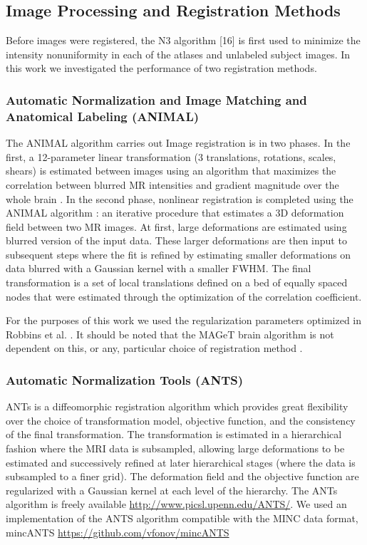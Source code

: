 \documentclass{article}\usepackage{graphicx, color}
\newcommand{\marginnote}[1]{\-\marginpar[\raggedleft\footnotesize #1]{\raggedright\footnotesize #1}}
\newcommand{\todo}[1]{\marginnote{\textcolor{red}{TODO #1}}}
\begin{document}
\subsection{Image Processing and Registration Methods}

Before images were registered, the N3 algorithm [16] is first used to minimize
the intensity nonuniformity in each of the atlases and unlabeled subject
images. In this work we investigated the performance of two registration
methods.  

\subsubsection{Automatic Normalization and Image Matching and Anatomical Labeling (ANIMAL)}

The ANIMAL algorithm carries out Image registration is in two phases. In the
first, a 12-parameter linear transformation (3 translations, rotations, scales,
shears) is estimated between images using an algorithm that maximizes the
correlation between blurred MR intensities and gradient magnitude over the
whole brain \citep{Collins}. In the second phase, nonlinear registration is completed using
the ANIMAL algorithm \citep{Collins1995}: an iterative procedure that estimates a 3D
deformation field between two MR images. At first, large deformations are
estimated using blurred version of the input data. These larger deformations
are then input to subsequent steps where the fit is refined by estimating
smaller deformations on data blurred with a Gaussian kernel with a smaller
FWHM. The final transformation is a set of local translations defined on a bed
of equally spaced nodes that were estimated through the optimization of the
correlation coefficient. 

For the purposes of this work we used the
regularization parameters optimized in Robbins et al. \citep{Robbins2004}. It
should be noted that the MAGeT brain algorithm is not dependent on this, or
any, particular choice of registration method \citep{Chakravarty2012}.

\todo{should add the MNI website here; also we should add the parameters we used somewhere}

\subsubsection{Automatic Normalization Tools (ANTS)}

ANTs is a diffeomorphic registration algorithm which provides great flexibility
over the choice of transformation model, objective function, and the
consistency of the final transformation. The transformation is estimated in a
hierarchical fashion where the MRI data is subsampled, allowing large
deformations to be estimated and successively refined at later hierarchical
stages (where the data is subsampled to a finer grid). The deformation field
and the objective function are regularized with a Gaussian kernel at each level
of the hierarchy. The ANTs algorithm is freely available
\url{http://www.picsl.upenn.edu/ANTS/}. We used an implementation of the ANTS
algorithm compatible with the MINC data format, mincANTS
\url{https://github.com/vfonov/mincANTS} \todo{(same here we should add the
parameters we used).}
\end{document}
